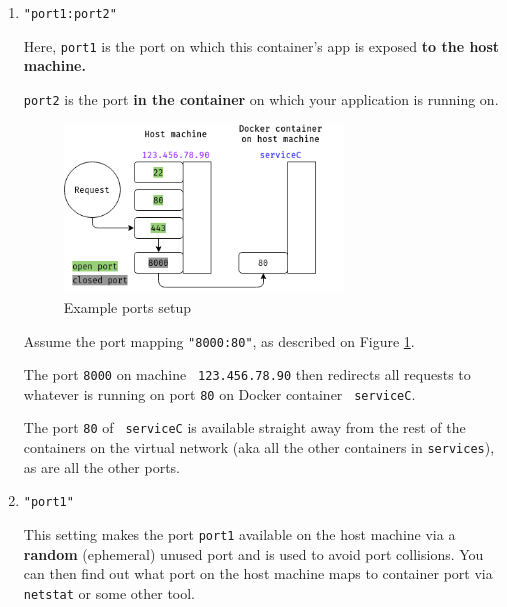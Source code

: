 \documentclass{article}
\newcommand{\dockerinline}[1]{\lstinline[language=docker, style=cstyle, basicstyle=\ttfamily\normalsize]{#1}}
\begin{document}
\begin{enumerate}
    \item{
            \texttt{"port1:port2"}

            Here, \texttt{port1} is the port on which this container's app is exposed \textbf{to the host machine.}

            \texttt{port2} is the port \textbf{in the container} on which your application is running on.

            \begin{figure}[h]
                \centering
                \includegraphics[width=0.7\textwidth]{img/docker_ports.png}
                \caption{Example ports setup}
                \label{preparations:dockerports}
            \end{figure}

            Assume the port mapping \texttt{"8000:80"}, as described on Figure \ref{preparations:dockerports}.

            The port \texttt{8000} on machine \texttt{\color[HTML]{9933FF} 123.456.78.90} then redirects all requests to whatever is running on port \texttt{80} on Docker container \texttt{\color[HTML]{3333FF} serviceC}.

            The port \texttt{80} of \texttt{\color[HTML]{3333FF} serviceC} is available straight away from the rest of the containers on the virtual network (aka all the other containers in \dockerinline{services}), as are all the other ports.
        }
    \item{
            \texttt{"port1"}

            This setting makes the port \texttt{port1} available on the host machine via a \textbf{random} (ephemeral) unused port and is used to avoid port collisions. You can then find out what port on the host machine maps to container port via \texttt{netstat} or some other tool.
        }
\end{enumerate}
\end{document}
